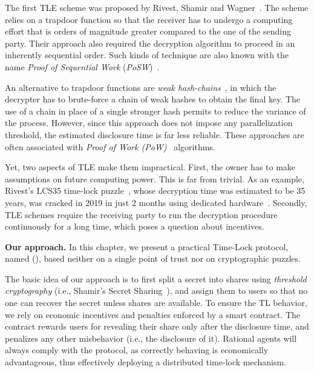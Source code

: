The first TLE scheme was proposed by Rivest, Shamir and Wagner~\cite{Rivest:1996:TPT:888615}.
The scheme relies on a trapdoor function so that the receiver has to undergo a computing effort that is orders of magnitude greater compared to the one of the sending party. Their approach also required the decryption algorithm to proceed in an inherently sequential order.
Such kinds of technique are also known with the name {\em Proof of Sequential Work} ({\em PoSW})~\cite{posw,cohen2018}.

An alternative to trapdoor functions are {\em weak hash-chains}~\cite{gwern}, in which the decrypter has to brute-force a chain of weak hashes to obtain the final key.
The use of a chain in place of a single stronger hash permits to reduce the variance of the process. 
However, since this approach does not impose any parallelization threshold, the estimated disclosure time is far less reliable.
These approaches are often associated with {\em Proof of Work (PoW)}~\cite{pow} algorithms.

Yet, two aspects of TLE make them impractical. First,
%
the owner has to make assumptions on future computing power. 
This is far from trivial.
As an example, Rivest's LCS35 time-lock puzzle~\cite{lcs35}, whose decryption time was estimated to be 35 years, was cracked in 2019 in just 2 months using dedicated hardware~\cite{lcs35-crack-open}.
%
Secondly, TLE schemes require the receiving party to run the decryption procedure continuously for a long time, which poses a question about incentives.


\medskip\textbf{Our approach.} In this chapter, we present a practical Time-Lock protocol, named {\em \name} ({\em \shortname}), based neither on a single point of trust nor on cryptographic puzzles.

The basic idea of our approach is to first split a secret into shares using {\em threshold cryptography} (i.e., Shamir's Secret Sharing~\cite{Shamir:1979:SS:359168.359176}), and assign them to users so that no one can recover the secret unless \KofN shares are available.
To ensure the TL behavior, we rely on economic incentives and penalties enforced by a smart contract.
The contract rewards users for revealing their share only after the disclosure time, and penalizes any other misbehavior (i.e., the disclosure of it). 
Rational agents will always comply with the protocol, as correctly behaving is economically advantageous, thus effectively deploying a distributed time-lock mechanism.

